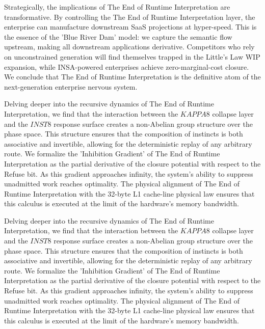 \documentclass[12pt,a4paper,oneside]{book}
\begin{document}
Strategically, the implications of The End of Runtime Interpretation are transformative. By controlling the The End of Runtime Interpretation layer, the enterprise can manufacture downstream SaaS projections at hyper-speed. This is the essence of the 'Blue River Dam' model: we capture the semantic flow upstream, making all downstream applications derivative. Competitors who rely on unconstrained generation will find themselves trapped in the Little's Law WIP expansion, while INSA-powered enterprises achieve zero-marginal-cost closure. We conclude that The End of Runtime Interpretation is the definitive atom of the next-generation enterprise nervous system. 

Delving deeper into the recursive dynamics of The End of Runtime Interpretation, we find that the interaction between the $KAPPA8$ collapse layer and the $INST8$ response surface creates a non-Abelian group structure over the phase space. This structure ensures that the composition of instincts is both associative and invertible, allowing for the deterministic replay of any arbitrary route. We formalize the 'Inhibition Gradient' of The End of Runtime Interpretation as the partial derivative of the closure potential with respect to the Refuse bit. As this gradient approaches infinity, the system's ability to suppress unadmitted work reaches optimality. The physical alignment of The End of Runtime Interpretation with the 32-byte L1 cache-line physical law ensures that this calculus is executed at the limit of the hardware's memory bandwidth. 

Delving deeper into the recursive dynamics of The End of Runtime Interpretation, we find that the interaction between the $KAPPA8$ collapse layer and the $INST8$ response surface creates a non-Abelian group structure over the phase space. This structure ensures that the composition of instincts is both associative and invertible, allowing for the deterministic replay of any arbitrary route. We formalize the 'Inhibition Gradient' of The End of Runtime Interpretation as the partial derivative of the closure potential with respect to the Refuse bit. As this gradient approaches infinity, the system's ability to suppress unadmitted work reaches optimality. The physical alignment of The End of Runtime Interpretation with the 32-byte L1 cache-line physical law ensures that this calculus is executed at the limit of the hardware's memory bandwidth. 
\end{document}
